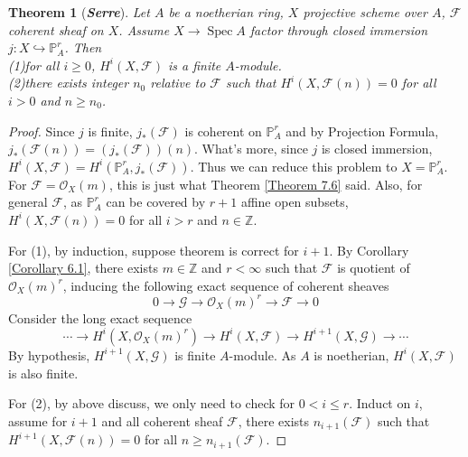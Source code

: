 \documentclass{ctexart}
\newtheorem{theorem}{Theorem}[section]
\newcommand{\spec}{\operatorname{Spec}}
\begin{document}
\begin{theorem}[\textbf{\emph{Serre}}]
    Let $A$ be a noetherian ring, $X$ projective scheme over $A$, $\mathcal{F}$ coherent sheaf on $X$.
    Assume $X \rightarrow \spec A$ factor through closed immersion $j: X \hookrightarrow \mathbb{P}_{A}^{r}$.
    Then \\
    (1)for all $i \ge 0$, $H^{i}(X, \mathcal{F})$ is a finite $A$-module. \\
    (2)there exists integer $n_{0}$ relative to $\mathcal{F}$ such that $H^{i}(X, \mathcal{F}(n)) = 0$ for all $i > 0$ and $n \ge n_{0}$.
    \label{Theorem 7.7}
\end{theorem}
\begin{proof}
    Since $j$ is finite, $j_{\ast}(\mathcal{F})$ is coherent on $\mathbb{P}_{A}^{r}$ and by Projection Formula, $j_{\ast}(\mathcal{F}(n)) = (j_{\ast}(\mathcal{F}))(n)$.
    What's more, since $j$ is closed immersion, $H^{i}(X, \mathcal{F}) = H^{i}(\mathbb{P}_{A}^{r}, j_{\ast}(\mathcal{F}))$.
    Thus we can reduce this problem to $X = \mathbb{P}_{A}^{r}$.
    For $\mathcal{F} = \mathcal{O}_{X}(m)$, this is just what Theorem \ref{Theorem 7.6} said.
    Also, for general $\mathcal{F}$, as $\mathbb{P}_{A}^{r}$ can be covered by $r + 1$ affine open subsets, 
    $H^{i}(X, \mathcal{F}(n)) = 0$ for all $i > r$ and $n\in \mathbb{Z}$.
    \par
    For (1), by induction, suppose theorem is correct for $i + 1$.
    By Corollary \ref{Corollary 6.1}, there exists $m\in \mathbb{Z}$ and $r < \infty$ such that $\mathcal{F}$ is quotient of $\mathcal{O}_{X}(m)^{r}$,
    inducing the following exact sequence of coherent sheaves
    \begin{equation*}
        0 \longrightarrow \mathcal{G} \longrightarrow \mathcal{O}_{X}(m)^{r} \longrightarrow \mathcal{F} \longrightarrow 0
    \end{equation*} 
    Consider the long exact sequence
    \begin{equation*}
        \cdots \longrightarrow H^{i}(X, \mathcal{O}_{X}(m)^{r}) \longrightarrow H^{i}(X, \mathcal{F}) \longrightarrow H^{i + 1}(X, \mathcal{G}) \longrightarrow \cdots
    \end{equation*}
    By hypothesis, $H^{i + 1}(X, \mathcal{G})$ is finite $A$-module.
    As $A$ is noetherian, $H^{i}(X, \mathcal{F})$ is also finite.
    \par
    For (2), by above discuss, we only need to check for $0 < i \le r$.
    Induct on $i$, assume for $i + 1$ and all coherent sheaf $\mathcal{F}$,
    there exists $n_{i + 1}(\mathcal{F})$ such that $H^{i + 1}(X, \mathcal{F}(n)) = 0$ for all $n \ge n_{i + 1}(\mathcal{F})$.

\end{proof}
\end{document}
